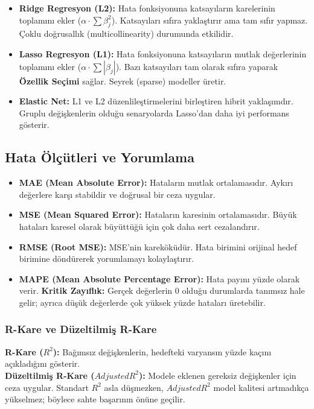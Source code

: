 \documentclass[12pt,a4paper]{article}
\begin{document}
\begin{itemize}
    \item \textbf{Ridge Regresyon (L2):} Hata fonksiyonuna katsayıların karelerinin toplamını ekler ($\alpha \cdot \sum \beta_j^2$). Katsayıları sıfıra yaklaştırır ama tam sıfır yapmaz. Çoklu doğrusallık (multicollinearity) durumunda etkilidir.
    \item \textbf{Lasso Regresyon (L1):} Hata fonksiyonuna katsayıların mutlak değerlerinin toplamını ekler ($\alpha \cdot \sum |\beta_j|$). Bazı katsayıları tam olarak sıfıra yaparak \textbf{Özellik Seçimi} sağlar. Seyrek (sparse) modeller üretir.
    \item \textbf{Elastic Net:} L1 ve L2 düzenlileştirmelerini birleştiren hibrit yaklaşımdır. Gruplu değişkenlerin olduğu senaryolarda Lasso'dan daha iyi performans gösterir.
\end{itemize}

\subsection{Hata Ölçütleri ve Yorumlama}
\begin{itemize}
    \item \textbf{MAE (Mean Absolute Error):} Hataların mutlak ortalamasıdır. Aykırı değerlere karşı stabildir ve doğrusal bir ceza uygular.
    \item \textbf{MSE (Mean Squared Error):} Hataların karesinin ortalamasıdır. Büyük hataları karesel olarak büyüttüğü için çok daha sert cezalandırır.
    \item \textbf{RMSE (Root MSE):} MSE'nin kareköküdür. Hata birimini orijinal hedef birimine döndürerek yorumlamayı kolaylaştırır.
    \item \textbf{MAPE (Mean Absolute Percentage Error):} Hata payını yüzde olarak verir. \textbf{Kritik Zayıflık:} Gerçek değerlerin 0 olduğu durumlarda tanımsız hale gelir; ayrıca düşük değerlerde çok yüksek yüzde hataları üretebilir.
\end{itemize}

\subsubsection{R-Kare ve Düzeltilmiş R-Kare}
\textbf{R-Kare ($R^2$):} Bağımsız değişkenlerin, hedefteki varyansın yüzde kaçını açıkladığını gösterir.
\\ \textbf{Düzeltilmiş R-Kare ($Adjusted R^2$):} Modele eklenen gereksiz değişkenler için ceza uygular. Standart $R^2$ asla düşmezken, $Adjusted R^2$ model kalitesi artmadıkça yükselmez; böylece sahte başarının önüne geçilir.
\end{document}
